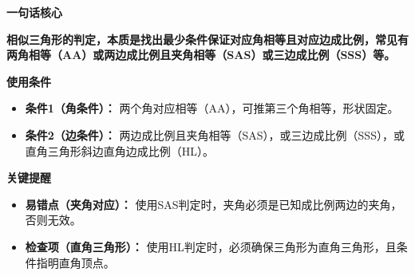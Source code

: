 \begin{summarybox}
	\textbf{\textcolor{CSummary}{一句话核心}}

	\textbf{相似三角形的判定，本质是找出最少条件保证对应角相等且对应边成比例，常见有两角相等（AA）或两边成比例且夹角相等（SAS）或三边成比例（SSS）等。}

	\medskip
	\textbf{\textcolor{CSummary}{使用条件}}
	\begin{itemize}[leftmargin=*, itemsep=0.5em, topsep=0.4em]
		\item \textbf{条件1（角条件）：} 两个角对应相等（AA），可推第三个角相等，形状固定。
		\item \textbf{条件2（边条件）：} 两边成比例且夹角相等（SAS），或三边成比例（SSS），或直角三角形斜边直角边成比例（HL）。
	\end{itemize}

	\medskip
	\textbf{\textcolor{CSummary}{关键提醒}}
	\begin{itemize}[leftmargin=*, itemsep=0.5em, topsep=0.4em]
		\item \textbf{易错点（夹角对应）：} 使用SAS判定时，夹角必须是已知成比例两边的夹角，否则无效。
		\item \textbf{检查项（直角三角形）：} 使用HL判定时，必须确保三角形为直角三角形，且条件指明直角顶点。
	\end{itemize}
\end{summarybox}

